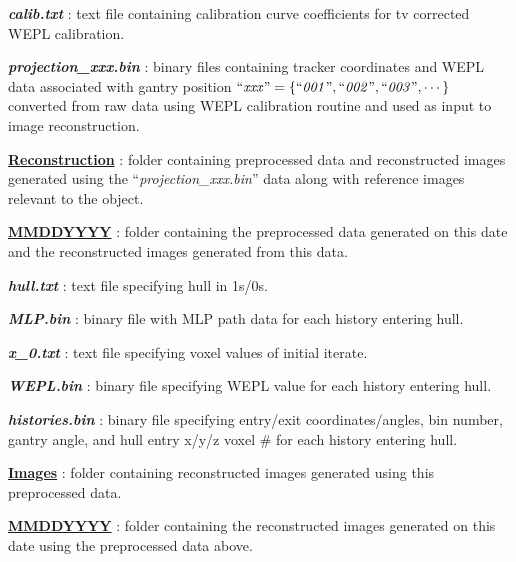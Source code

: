 \documentclass{article}
\begin{document}
\begin{myEnumerate}[labelindent=0pt, leftmargin=*]
\begin{myEnumerate}[labelindent=1pt, leftmargin=*]
\begin{myEnumerate}[labelindent=1pt, leftmargin=*]
\begin{myEnumerate}[labelindent=1pt, leftmargin=*]
\begin{myEnumerate}[labelindent=1pt, leftmargin=*]
\begin{myEnumerate}[labelindent=1pt, leftmargin=*]
\begin{myEnumerate}[labelindent=1pt, leftmargin=*]
                            \item \textbf{\textit{calib.txt}} : text file containing calibration curve coefficients for tv corrected WEPL calibration.
                            \item \textbf{\textit{projection\_xxx.bin}} : binary files containing tracker coordinates and WEPL data associated with gantry position $\textrm{``\textit{xxx}''} =\{\textrm{``\textit{001}''}, \textrm{``\textit{002}''}, \textrm{``\textit{003}''}, \cdots\}$ converted from raw data using WEPL calibration routine and used as input to image reconstruction.
                            \item \ul{\textbf{Reconstruction}} : folder containing preprocessed data and reconstructed images generated using the ``\textit{projection\_xxx.bin}'' data along with reference images relevant to the object.
                            \begin{myEnumerate}[labelindent=1pt, leftmargin=*]
                                \item \ul{\textbf{MMDDYYYY}} : folder containing the preprocessed data generated on this date and the reconstructed images generated from this data.
                                \begin{myEnumerate}[labelindent=1pt, leftmargin=*]
                                    \item \textbf{\textit{hull.txt}} : text file specifying hull in 1s/0s.
                                    \item \textbf{\textit{MLP.bin}} : binary file with MLP path data for each history entering hull.
                                    \item \textbf{\textit{x\_0.txt}} : text file specifying voxel values of initial iterate.
                                    \item \textbf{\textit{WEPL.bin}} : binary file specifying WEPL value for each history entering hull.
                                    \item \textbf{\textit{histories.bin}} : binary file specifying entry/exit coordinates/angles, bin number, gantry angle, and hull entry x/y/z voxel \# for each history entering hull.
                                    \item \ul{\textbf{Images}} : folder containing reconstructed images generated using this preprocessed data.
                                    \begin{myEnumerate}[labelindent=1pt, leftmargin=*]
                                        \item \ul{\textbf{MMDDYYYY}} : folder containing the reconstructed images generated on this date using the preprocessed data above.

\end{myEnumerate}
\end{myEnumerate}
\end{myEnumerate}
\end{myEnumerate}
\end{myEnumerate}
\end{myEnumerate}
\end{myEnumerate}
\end{myEnumerate}
\end{myEnumerate}
\end{myEnumerate}
\end{document}
